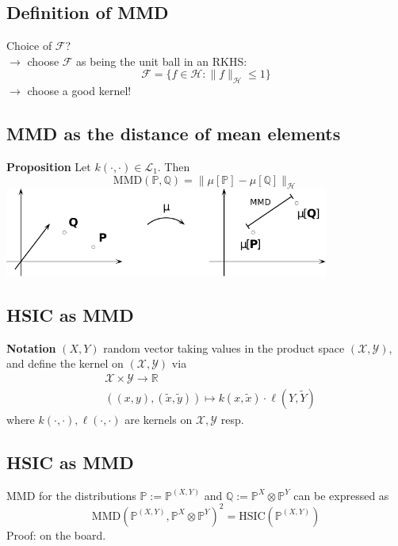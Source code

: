 \clearpage

\subsection*{Definition of MMD}
Choice of $\mathcal{F}$?\\
$\rightarrow$ choose $\mathcal F$ as being the unit ball in an RKHS:
\begin{equation*}
\mathcal{F}=\{f\in\mathcal H:\|f\|_\mathcal H\leq 1\}
\end{equation*}
$\rightarrow$ choose a good kernel!
\clearpage

\subsection*{MMD as the distance of mean elements}
\textbf{Proposition}
Let $k(\cdot,\cdot)\in \mathcal{L}_1$. Then
\begin{equation*}
\text{MMD}(\mathbb P,\mathbb Q)=\|\mu[\mathbb{P}]-\mu[\mathbb{Q}]\|_\mathcal H
\end{equation*}
\includegraphics[width=0.8\textwidth]{geometric_mean_embedding.pdf}
\clearpage

\subsection*{HSIC as MMD}
\textbf{Notation}
$(X,Y)$ random vector taking values in the product space $(\mathcal{X},\mathcal{Y})$, and define the kernel on $(\mathcal{X},\mathcal{Y})$ via
\begin{align*}
&\mathcal{X}\times\mathcal{Y}\rightarrow\mathbb{R}\\
&((x,y),(\tilde x,\tilde y))\mapsto k(x,\tilde x)\cdot \ell (Y,\tilde Y)
\end{align*}
where $k(\cdot,\cdot),\ell(\cdot,\cdot)$ are kernels on $\mathcal X,\mathcal Y$ resp.

\clearpage

\subsection*{HSIC as MMD}
MMD for the distributions $\mathbb P:=\mathbb{P}^{(X,Y)}$ and $\mathbb Q:=\mathbb{P}^{X}\otimes\mathbb{P}^{Y}$ can be expressed as
\begin{equation*}
\text{MMD}(\mathbb{P}^{(X,Y)},\mathbb{P}^{X}\otimes\mathbb{P}^{Y})^2=\text{HSIC}(\mathbb{P}^{(X,Y)})
\end{equation*}
Proof: on the board.

